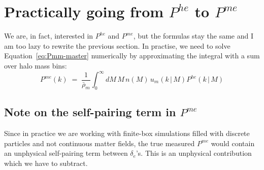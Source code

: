 \documentclass{article}
\begin{document}
\section{Practically going from $P^{he}$ to $P^{me}$}

We are, in fact, interested in $P^{he}$ and $P^{me}$, but the formulas stay the same and I am too lazy to rewrite the previous section. In practise, we need to solve Equation~\ref{eq:Pmm-master} numerically by approximating the integral with a sum over halo mass bins:
\begin{equation} \label{eq:Pme}
    P^{me}(k) \;=\; \frac{1}{\bar \rho_m} \int_0^\infty dM \, M \, n(M) \, u_m(k\,|\,M) P^{he}(k\, |\, M)
\end{equation}

\subsection{Note on the self-pairing term in $P^{me}$}

Since in practice we are working with finite-box simulations filled with discrete particles and not continuous matter fields, the true measured $P^{me}$ would contain an unphysical self-pairing term between $\delta_e$'s. This is an unphysical contribution which we have to subtract. 
\end{document}
